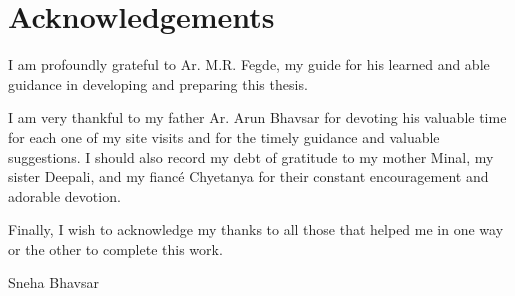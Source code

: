 \section*{Acknowledgements} %
\label{sec:ack}

I am profoundly grateful to Ar. M.R. Fegde, my guide for his learned and able guidance in developing and preparing this thesis.

I am very thankful to my father Ar. Arun Bhavsar for devoting his valuable time for each one of my site visits and for the timely guidance and valuable suggestions. I should also record my debt of gratitude to my mother Minal, my sister Deepali, and my fianc\'{e} Chyetanya for their constant encouragement and adorable devotion.

Finally, I wish to acknowledge my thanks to all those that helped me in one way or the other to complete this work.

\vspace{3mm}
\hfill Sneha Bhavsar

\vfill

